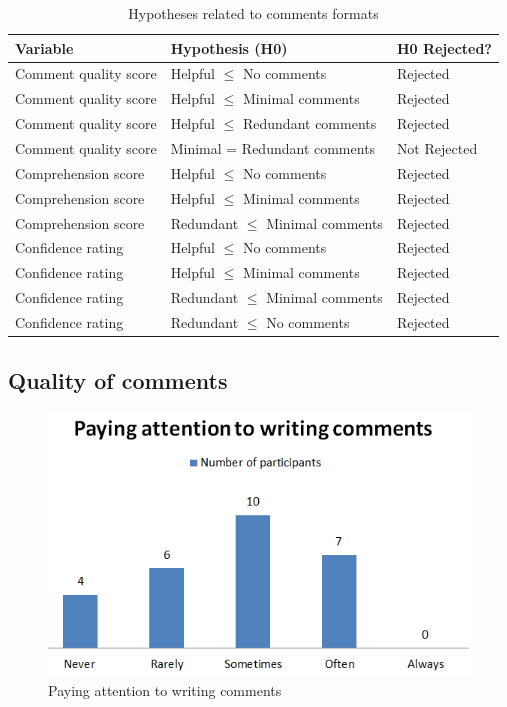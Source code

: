 \begin{table}[ht]
\centering
\small
\begin{tabular}{|p{4cm}|p{6cm}|p{2.5cm}|}
\hline
\rule{0pt}{1.2em}\textbf{Variable} & \textbf{Hypothesis (H0)} & \textbf{H0 Rejected?} \\[0.5em]
\hline
\rule{0pt}{1.2em}Comment quality score & Helpful $\leq$ No comments & Rejected \\[0.5em]
\hline
\rule{0pt}{1.2em}Comment quality score & Helpful $\leq$ Minimal comments & Rejected \\[0.5em]
\hline
\rule{0pt}{1.2em}Comment quality score & Helpful $\leq$ Redundant comments & Rejected \\[0.5em]
\hline
\rule{0pt}{1.2em}Comment quality score & Minimal = Redundant comments & Not Rejected \\[0.5em]
\hline
\rule{0pt}{1.2em}Comprehension score & Helpful $\leq$ No comments & Rejected \\[0.5em]
\hline
\rule{0pt}{1.2em}Comprehension score & Helpful $\leq$ Minimal comments & Rejected \\[0.5em]
\hline
\rule{0pt}{1.2em}Comprehension score & Redundant $\leq$ Minimal comments & Rejected \\[0.5em]
\hline
\rule{0pt}{1.2em}Confidence rating & Helpful $\leq$ No comments & Rejected \\[0.5em]
\hline
\rule{0pt}{1.2em}Confidence rating & Helpful $\leq$ Minimal comments & Rejected \\[0.5em]
\hline
\rule{0pt}{1.2em}Confidence rating & Redundant $\leq$ Minimal comments & Rejected \\[0.5em]
\hline
\rule{0pt}{1.2em}Confidence rating & Redundant $\leq$ No comments & Rejected \\[0.5em]
\hline
\end{tabular}
\caption{Hypotheses related to comments formats}
\end{table}



\subsection{Quality of comments}
\begin{figure} [H]
  \centering
  \includegraphics[scale=0.85]{figures/comAt.png}
  \caption{Paying attention to writing comments }
  \label{fig:AnhangsChor}
\end{figure}

